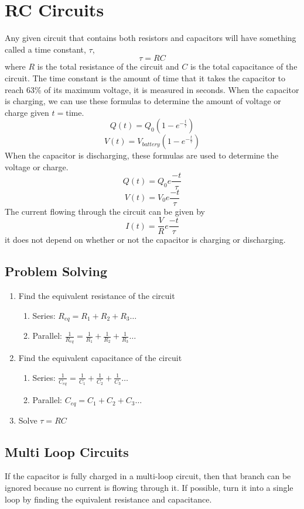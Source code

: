 \documentclass{article}
\begin{document}
\section{RC Circuits}
Any given circuit that contains both resistors and capacitors will have something called a time constant, $\tau$,
\[ \tau = RC \]
where $R$ is the total resistance of the circuit and $C$ is the total capacitance of the circuit.  The time constant is the amount of time that it takes the capacitor to reach 63\% of its maximum voltage, it is measured in seconds.
When the capacitor is charging, we can use these formulas to determine the amount of voltage or charge given $t=\text{time}$.
\[ Q(t) = Q_0 ( 1 - e^{-\frac{t}{\tau}} ) \]
\[ V(t) = V_{battery} ( 1 - e^{-\frac{t}{\tau}} ) \]
When the capacitor is discharging, these formulas are used to determine the voltage or charge.
\[ Q(t) = Q_0e\frac{-t}{\tau} \]
\[ V(t) = V_0e\frac{-t}{\tau} \]
The current flowing through the circuit can be given by
\[ I(t) = \frac{V}{R}e\frac{-t}{\tau} \]
it does not depend on whether or not the capacitor is charging or discharging.
\subsection{Problem Solving}
\begin{enumerate}
\item Find the equivalent resistance of the circuit
  \begin{enumerate}
  \item Series: $R_{eq} = R_1 + R_2 + R_3 \ldots$
  \item Parallel: $\frac{1}{R_{eq}} = \frac{1}{R_1} + \frac{1}{R_2} + \frac{1}{R_3} \ldots$
  \end{enumerate}
\item Find the equivalent capacitance of the circuit
  \begin{enumerate}
  \item Series: $\frac{1}{C_{eq}} = \frac{1}{C_1} + \frac{1}{C_2} + \frac{1}{C_3} \ldots$
  \item Parallel: $C_{eq} = C_1 + C_2 + C_3 \ldots$
  \end{enumerate}
\item Solve $\tau=RC$
\end{enumerate}
\subsection{Multi Loop Circuits}
If the capacitor is fully charged in a multi-loop circuit, then that branch can be ignored because no current is flowing through it.  If possible, turn it into a single loop by finding the equivalent resistance and capacitance.
\end{document}
